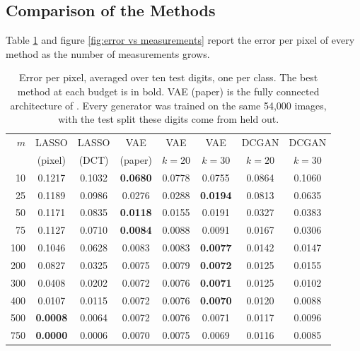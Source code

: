 \subsection{Comparison of the Methods}

Table \ref{tab:results} and figure \ref{fig:error vs measurements} report the error per pixel of every method as the number of measurements grows.

\begin{table}[H]
    \centering
    \small
    \begin{tabular}{r|cc|ccccc}
    \( m \) & LASSO & LASSO & VAE & VAE & VAE & DCGAN & DCGAN \\
     & (pixel) & (DCT) & (paper) & \( k{=}20 \) & \( k{=}30 \) & \( k{=}20 \) & \( k{=}30 \) \\
    \hline
    10  & 0.1217 & 0.1032 & \textbf{0.0680} & 0.0778 & 0.0755 & 0.0864 & 0.1060 \\
    25  & 0.1189 & 0.0986 & 0.0276 & 0.0288 & \textbf{0.0194} & 0.0813 & 0.0635 \\
    50  & 0.1171 & 0.0835 & \textbf{0.0118} & 0.0155 & 0.0191 & 0.0327 & 0.0383 \\
    75  & 0.1127 & 0.0710 & \textbf{0.0084} & 0.0088 & 0.0091 & 0.0167 & 0.0306 \\
    100 & 0.1046 & 0.0628 & 0.0083 & 0.0083 & \textbf{0.0077} & 0.0142 & 0.0147 \\
    200 & 0.0827 & 0.0325 & 0.0075 & 0.0079 & \textbf{0.0072} & 0.0125 & 0.0155 \\
    300 & 0.0408 & 0.0202 & 0.0072 & 0.0076 & \textbf{0.0071} & 0.0125 & 0.0102 \\
    400 & 0.0107 & 0.0115 & 0.0072 & 0.0076 & \textbf{0.0070} & 0.0120 & 0.0088 \\
    500 & \textbf{0.0008} & 0.0064 & 0.0072 & 0.0076 & 0.0071 & 0.0117 & 0.0096 \\
    750 & \textbf{0.0000} & 0.0006 & 0.0070 & 0.0075 & 0.0069 & 0.0116 & 0.0085 \\
    \end{tabular}
    \caption{Error per pixel, averaged over ten test digits, one per class. The best method at each budget is in bold. VAE (paper) is the fully connected architecture of \cite{bora2017}. Every generator was trained on the same 54,000 images, with the test split these digits come from held out.}
    \label{tab:results}
\end{table}

